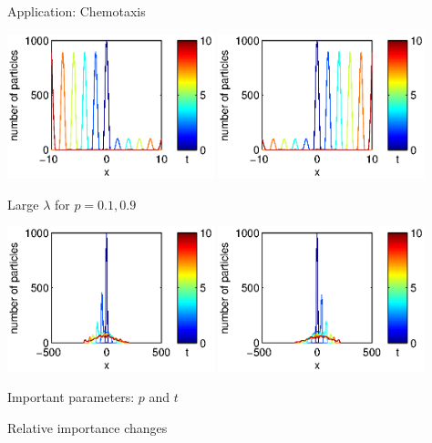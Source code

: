\documentclass[12pt]{beamer}
\begin{document}
\begin{frame}{Application: Chemotaxis}
\begin{minipage}{0.42\textwidth}
\includegraphics[width=0.45\textwidth]{chemotaxis_hist_colored_small_lambda1}
\includegraphics[width=0.45\textwidth]{chemotaxis_hist_colored_small_lambda2}

{\scriptsize Large $\lambda$ for $p=0.1, 0.9$}

\includegraphics[width=0.45\textwidth]{chemotaxis_hist_colored_large_lambda1}
\includegraphics[width=0.45\textwidth]{chemotaxis_hist_colored_large_lambda2}

{\footnotesize
Important parameters: $p$ and $t$

Relative importance changes
\par}

\end{minipage}


\end{frame}
\end{document}

